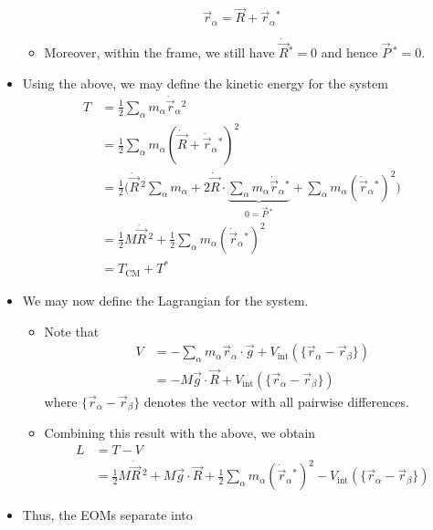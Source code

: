 \documentclass[../notes.tex]{subfiles}
\begin{document}
\begin{itemize}
\begin{equation*}
        \vec{r}_\alpha = \vec{R}+\vec{r}_\alpha{}^*
    \end{equation*}
    \begin{itemize}
        \item Moreover, within the frame, we still have $\dot{\vec{R}}{}^*=0$ and hence $\vec{P}{\,}^*=0$.
    \end{itemize}
    \item Using the above, we may define the kinetic energy for the system
    \begin{align*}
        T &= \frac{1}{2}\sum_\alpha m_\alpha\dot{\vec{r}}_\alpha{}^2\\
        &= \frac{1}{2}\sum_\alpha m_\alpha(\dot{\vec{R}}+\dot{\vec{r}}_\alpha{}^*)^2\\
        &= \frac{1}{2}\Bigg( \dot{\vec{R}}{\,}^2\sum_\alpha m_\alpha+2\dot{\vec{R}}\cdot\underbrace{\sum_\alpha m_\alpha\dot{\vec{r}}_\alpha{}^*}_{0=\vec{P}{\,}^*}+\sum_\alpha m_\alpha(\dot{\vec{r}}_\alpha{}^*)^2 \Bigg)\\
        &= \frac{1}{2}M\dot{\vec{R}}{\,}^2+\frac{1}{2}\sum_\alpha m_\alpha(\dot{\vec{r}}_\alpha{}^*)^2\\
        &= T_\text{CM}+T^*
    \end{align*}
    \item We may now define the Lagrangian for the system.
    \begin{itemize}
        \item Note that
        \begin{align*}
            V &= -\sum_\alpha m_\alpha\vec{r}_\alpha\cdot\vec{g}+V_\text{int}(\{\vec{r}_\alpha-\vec{r}_\beta\})\\
            &= -M\vec{g}\cdot\vec{R}+V_\text{int}(\{\vec{r}_\alpha-\vec{r}_\beta\})
        \end{align*}
        where $\{\vec{r}_\alpha-\vec{r}_\beta\}$ denotes the vector with all pairwise differences.
        \item Combining this result with the above, we obtain
        \begin{align*}
            L &= T-V\\
            &= \frac{1}{2}M\dot{\vec{R}}{\,}^2+M\vec{g}\cdot\vec{R}+\frac{1}{2}\sum_\alpha m_\alpha(\dot{\vec{r}}_\alpha{}^*)^2-V_\text{int}(\{\vec{r}_\alpha-\vec{r}_\beta\})
        \end{align*}
    \end{itemize}
    \item Thus, the EOMs separate into
    \begin{align*}

\end{align*}
\end{itemize}
\end{document}
